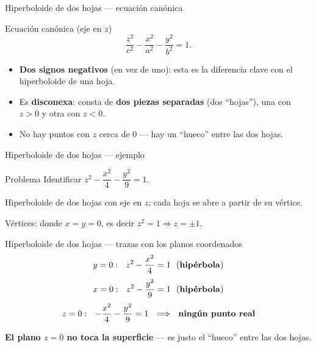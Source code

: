 \documentclass[11pt,aspectratio=169]{beamer}
\begin{document}

\begin{frame}{Hiperboloide de dos hojas --- ecuación canónica}
  \begin{block}{Ecuación canónica (eje en $z$)}
    \[
      \frac{z^2}{c^2}-\frac{x^2}{a^2}-\frac{y^2}{b^2}=1.
    \]
  \end{block}
  \pause
  \begin{itemize}
    \item \textbf{Dos signos negativos} (en vez de uno): esta es la diferencia clave con el hiperboloide de una hoja.
    \pause
    \item Es \textbf{disconexa}: consta de \textbf{dos piezas separadas} (dos ``hojas''), una con $z>0$ y otra con $z<0$.
    \pause
    \item No hay puntos con $z$ cerca de $0$ --- hay un ``hueco'' entre las dos hojas.
  \end{itemize}
\end{frame}

\begin{frame}{Hiperboloide de dos hojas --- ejemplo}
  \begin{block}{Problema}
    Identificar $z^2-\dfrac{x^2}{4}-\dfrac{y^2}{9}=1$.
  \end{block}
  \pause
  \begin{center}\normalsize\color{tealx}
  Hiperboloide de dos hojas con eje en $z$; cada hoja se abre a partir de su vértice.
  \end{center}
  \pause
  \begin{center}\small\color{gray60}
  Vértices: donde $x=y=0$, es decir $z^2=1 \Rightarrow z=\pm1$.
  \end{center}
\end{frame}

\begin{frame}{Hiperboloide de dos hojas --- trazas con los planos coordenados}
  \[
    y=0:\ \ z^2-\frac{x^2}{4}=1 \ \ \text{(\textbf{hipérbola})}
  \]
  \pause
  \[
    x=0:\ \ z^2-\frac{y^2}{9}=1 \ \ \text{(\textbf{hipérbola})}
  \]
  \pause
  \[
    z=0:\ \ -\frac{x^2}{4}-\frac{y^2}{9}=1 \ \ \Longrightarrow\ \ \text{\textbf{ningún punto real}}
  \]
  \pause
  \begin{center}\normalsize\color{brick}
  \textbf{El plano $z=0$ no toca la superficie} --- es justo el ``hueco'' entre las dos hojas.
  \end{center}
\end{frame}
\end{document}
